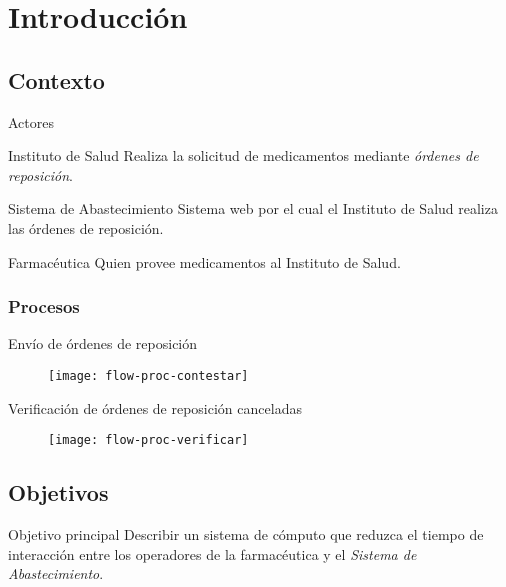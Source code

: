 \section{Introducción}
\subsection{Contexto}
	\begin{frame}{Actores}
		\begin{block}{Instituto de Salud}
			Realiza la solicitud de medicamentos mediante \textit{órdenes de reposición}.
		\end{block}
		\begin{block}{Sistema de Abastecimiento}
			Sistema web por el cual el Instituto de Salud realiza las órdenes de reposición.
		\end{block}
		\begin{block}{Farmacéutica}
			Quien provee medicamentos al Instituto de Salud.
		\end{block}
	\end{frame}

\subsubsection{Procesos}
	\begin{frame}{Envío de órdenes de reposición}
		\begin{figure}[H]
		\centering
		\texttt{[image: flow-proc-contestar]} 
		\label{fig:flow-proc-contestar}
		\end{figure}
	\end{frame}

	\begin{frame}{Verificación de órdenes de reposición canceladas}
		\begin{figure}[H]
		\centering
		\texttt{[image: flow-proc-verificar]} 
		\label{fig:flow-proc-verificar}
		\end{figure}
	\end{frame}

\subsection{Objetivos}
	\begin{frame}{Objetivo principal}
		Describir un sistema de cómputo que reduzca el tiempo de interacción entre los operadores de la farmacéutica y el \textit{Sistema de Abastecimiento}.
	\end{frame}

